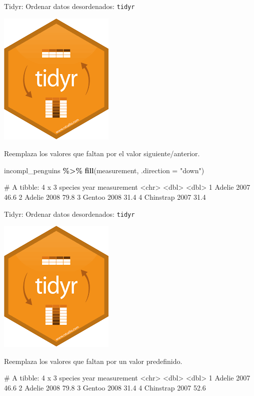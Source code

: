 \documentclass[
  ignorenonframetext,
  aspectratio=169]{beamer}
\newenvironment{Shaded}{\begin{snugshade}}{\end{snugshade}}
\newcommand{\AttributeTok}[1]{\textcolor[rgb]{0.13,0.29,0.53}{#1}}
\newcommand{\FunctionTok}[1]{\textcolor[rgb]{0.13,0.29,0.53}{\textbf{#1}}}
\newcommand{\NormalTok}[1]{#1}
\newcommand{\SpecialCharTok}[1]{\textcolor[rgb]{0.81,0.36,0.00}{\textbf{#1}}}
\newcommand{\StringTok}[1]{\textcolor[rgb]{0.31,0.60,0.02}{#1}}
\let\oldverbatim\verbatim
\let\endoldverbatim\endverbatim
\renewenvironment{verbatim}{\tiny\oldverbatim}{\endoldverbatim}
\begin{document}
\begin{frame}[fragile]{Tidyr: Ordenar datos desordenados:
\texttt{tidyr}}
\label{tidyr-ordenar-datos-desordenados-tidyr-16}
\begin{flushright}\includegraphics[width=0.05\linewidth]{Imgs/logo_tidyr} \end{flushright}

Reemplaza los valores que faltan por el valor siguiente/anterior.

\begin{Shaded}
\begin{Highlighting}[]
\NormalTok{incompl\_penguins }\SpecialCharTok{\%\textgreater{}\%} 
  \FunctionTok{fill}\NormalTok{(measurement, }\AttributeTok{.direction =} \StringTok{"down"}\NormalTok{)}
\end{Highlighting}
\end{Shaded}

\begin{verbatim}
# A tibble: 4 x 3
  species    year measurement
  <chr>     <dbl>       <dbl>
1 Adelie     2007        46.6
2 Adelie     2008        79.8
3 Gentoo     2008        31.4
4 Chinstrap  2007        31.4
\end{verbatim}
\end{frame}

\begin{frame}[fragile]{Tidyr: Ordenar datos desordenados:
\texttt{tidyr}}
\label{tidyr-ordenar-datos-desordenados-tidyr-17}
\begin{flushright}\includegraphics[width=0.05\linewidth]{Imgs/logo_tidyr} \end{flushright}

Reemplaza los valores que faltan por un valor predefinido.

\begin{Shaded}
\end{Shaded}

\begin{verbatim}
# A tibble: 4 x 3
  species    year measurement
  <chr>     <dbl>       <dbl>
1 Adelie     2007        46.6
2 Adelie     2008        79.8
3 Gentoo     2008        31.4
4 Chinstrap  2007        52.6
\end{verbatim}
\end{frame}
\end{document}
